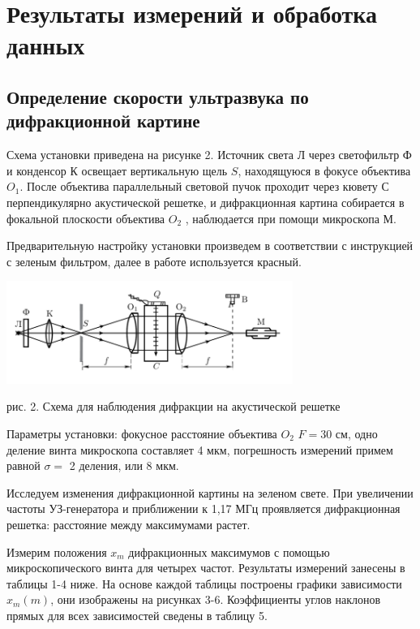 \section{Результаты измерений и обработка данных}

\subsection{Определение скорости ультразвука по дифракционной картине}

Схема установки приведена на рисунке 2. Источник света Л через светофильтр Ф и конденсор К освещает вертикальную щель $ S $, находящуюся в фокусе объектива $ O_1 $. После объектива параллельный световой пучок проходит через кювету С перпендикулярно акустической решетке, и дифракционная картина собирается в фокальной плоскости объектива $ O_2 $ , наблюдается при помощи микроскопа М.

Предварительную настройку установки произведем в соответствии с инструкцией с зеленым фильтром, далее в работе используется красный.

\begin{center}
\includegraphics[width=0.7\textwidth]{2.png}

рис. 2. Схема для наблюдения дифракции на акустической решетке
\label{shema1}
\end{center}

Параметры установки: фокусное расстояние объектива $  O_2  $ $ F = 30 $ см, одно деление винта микроскопа составляет 4 мкм, погрешность измерений примем равной  $ \sigma = $ 2 деления, или 8 мкм.

Исследуем изменения дифракционной картины на зеленом свете. При увеличении частоты УЗ-генератора и приближении к 1,17 МГц проявляется дифракционная решетка: расстояние между максимумами растет.

Измерим положения $ x_m $ дифракционных максимумов с помощью микроскопического винта для четырех частот. Результаты измерений занесены в таблицы 1-4 ниже. На основе каждой таблицы построены графики зависимости $ x_m (m) $, они изображены на рисунках 3-6. Коэффициенты углов наклонов прямых для всех зависимостей сведены в таблицу 5. 

